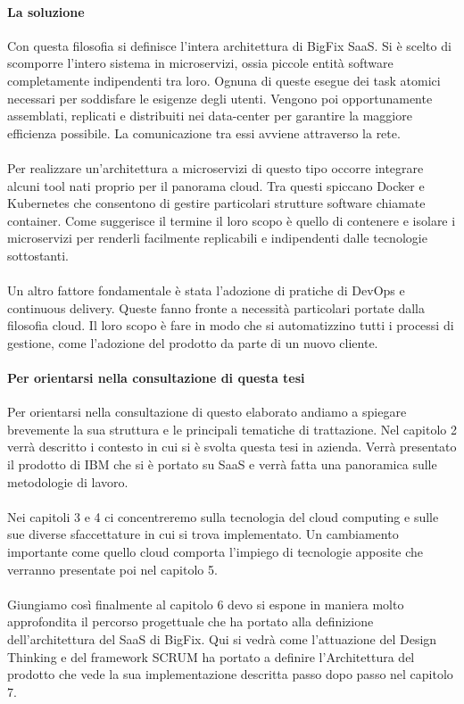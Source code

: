 \paragraph{La soluzione}
Con questa filosofia si definisce l'intera architettura di BigFix SaaS. Si è scelto di scomporre l'intero sistema in microservizi, ossia piccole entità software completamente indipendenti tra loro. Ognuna di queste esegue dei task atomici necessari per soddisfare le esigenze degli utenti. Vengono poi opportunamente assemblati, replicati e distribuiti nei data-center per garantire la maggiore efficienza possibile. La comunicazione tra essi avviene attraverso la rete.
\paragraph{}
Per realizzare un'architettura a microservizi di questo tipo occorre integrare alcuni tool nati proprio per il panorama cloud. Tra questi spiccano Docker e Kubernetes che consentono di gestire particolari strutture software chiamate container. Come suggerisce il termine il loro scopo è quello di contenere e isolare i microservizi per renderli facilmente replicabili e indipendenti dalle tecnologie sottostanti.
\paragraph{}
Un altro fattore fondamentale è stata l'adozione di pratiche di DevOps e continuous delivery. Queste fanno fronte a necessità particolari portate dalla filosofia cloud. Il loro scopo è fare in modo che si automatizzino tutti i processi di gestione, come l'adozione del prodotto da parte di un nuovo cliente.

\paragraph{Per orientarsi nella consultazione di questa tesi}
Per orientarsi nella consultazione di questo elaborato andiamo a spiegare brevemente la sua struttura e le principali tematiche di trattazione. Nel capitolo 2 verrà descritto i contesto in cui si è svolta questa tesi in azienda. Verrà presentato il prodotto di IBM che si è portato su SaaS e verrà fatta una panoramica sulle metodologie di lavoro.
\paragraph{}
Nei capitoli 3 e 4 ci concentreremo sulla tecnologia del cloud computing e sulle sue diverse sfaccettature in cui si trova implementato. Un cambiamento importante come quello cloud comporta l'impiego di tecnologie apposite che verranno presentate poi nel capitolo 5.
\paragraph{}
Giungiamo così finalmente al capitolo 6 devo si espone in maniera molto approfondita il percorso progettuale che ha portato alla definizione dell'architettura del SaaS di BigFix. Qui si vedrà come l'attuazione del Design Thinking e del framework SCRUM ha portato a definire l'Architettura del prodotto che vede la sua implementazione descritta passo dopo passo nel capitolo 7.